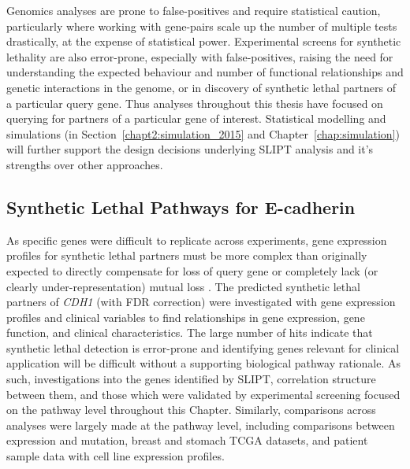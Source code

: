 Genomics analyses are prone to false-positives and require statistical caution, particularly where working with gene-pairs scale up the number of multiple tests drastically, at the expense of statistical power.  Experimental screens for synthetic lethality are also error-prone, especially with false-positives, raising the need for understanding the expected behaviour and number of functional relationships and genetic interactions in the genome, or in discovery of synthetic lethal partners of a particular query gene. Thus analyses throughout this thesis have focused on querying for partners of a particular gene of interest. Statistical modelling and simulations (in Section~\ref{chapt2:simulation_2015} and Chapter~\ref{chap:simulation}) will further support the design decisions underlying \gls{SLIPT} analysis and it's strengths over other approaches.

\subsection{Synthetic Lethal Pathways for E-cadherin}

As specific genes were difficult to replicate across experiments, gene expression profiles for synthetic lethal partners must be more complex than originally expected to directly compensate for loss of query gene or completely lack (or clearly under-represent\-ation) mutual loss \citep{Kelly2013, Jerby2014, Lu2015}. The predicted synthetic lethal partners of \textit{CDH1} (with FDR correction) were investigated with gene expression profiles and clinical variables to find relationships in gene expression, gene function, and clinical characteristics. The large number of hits indicate that synthetic lethal detection is error-prone and identifying genes relevant for clinical application will be difficult without a supporting biological pathway rationale. As such, investigations into the genes identified by \gls{SLIPT}, correlation structure between them, and those which were validated by experimental screening \citep{Telford2015} focused on the pathway level throughout this Chapter. Similarly, comparisons across analyses were largely made at the pathway level, including comparisons between expression and mutation, breast and stomach TCGA datasets, and patient sample data with cell line expression profiles.

